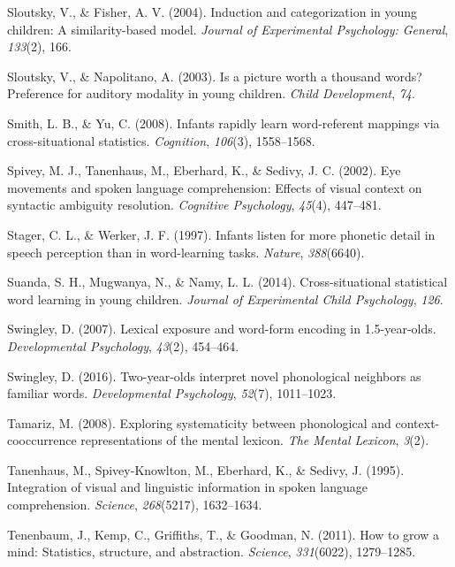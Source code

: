 \documentclass[english,,man,floatsintext]{apa6}
\theoremstyle{definition}
\theoremstyle{definition}
\theoremstyle{definition}
\theoremstyle{remark}
\begin{document}
\hypertarget{ref-sloutsky2004}{}
Sloutsky, V., \& Fisher, A. V. (2004). Induction and categorization in
young children: A similarity-based model. \emph{Journal of Experimental
Psychology: General}, \emph{133}(2), 166.

\hypertarget{ref-sloutsky2003}{}
Sloutsky, V., \& Napolitano, A. (2003). Is a picture worth a thousand
words? Preference for auditory modality in young children. \emph{Child
Development}, \emph{74}.

\hypertarget{ref-smith08}{}
Smith, L. B., \& Yu, C. (2008). Infants rapidly learn word-referent
mappings via cross-situational statistics. \emph{Cognition},
\emph{106}(3), 1558--1568.

\hypertarget{ref-spivey2002}{}
Spivey, M. J., Tanenhaus, M., Eberhard, K., \& Sedivy, J. C. (2002). Eye
movements and spoken language comprehension: Effects of visual context
on syntactic ambiguity resolution. \emph{Cognitive Psychology},
\emph{45}(4), 447--481.

\hypertarget{ref-stager1997}{}
Stager, C. L., \& Werker, J. F. (1997). Infants listen for more phonetic
detail in speech perception than in word-learning tasks. \emph{Nature},
\emph{388}(6640).

\hypertarget{ref-suanda2014}{}
Suanda, S. H., Mugwanya, N., \& Namy, L. L. (2014). Cross-situational
statistical word learning in young children. \emph{Journal of
Experimental Child Psychology}, \emph{126}.

\hypertarget{ref-Swingley2007}{}
Swingley, D. (2007). Lexical exposure and word-form encoding in
1.5-year-olds. \emph{Developmental Psychology}, \emph{43}(2), 454--464.

\hypertarget{ref-Swingley2016}{}
Swingley, D. (2016). Two-year-olds interpret novel phonological
neighbors as familiar words. \emph{Developmental Psychology},
\emph{52}(7), 1011--1023.

\hypertarget{ref-Tamariz2008}{}
Tamariz, M. (2008). Exploring systematicity between phonological and
context-cooccurrence representations of the mental lexicon. \emph{The
Mental Lexicon}, \emph{3}(2).

\hypertarget{ref-Tanenhaus1995}{}
Tanenhaus, M., Spivey-Knowlton, M., Eberhard, K., \& Sedivy, J. (1995).
Integration of visual and linguistic information in spoken language
comprehension. \emph{Science}, \emph{268}(5217), 1632--1634.

\hypertarget{ref-tenenbaum11}{}
Tenenbaum, J., Kemp, C., Griffiths, T., \& Goodman, N. (2011). How to
grow a mind: Statistics, structure, and abstraction. \emph{Science},
\emph{331}(6022), 1279--1285.
\end{document}
